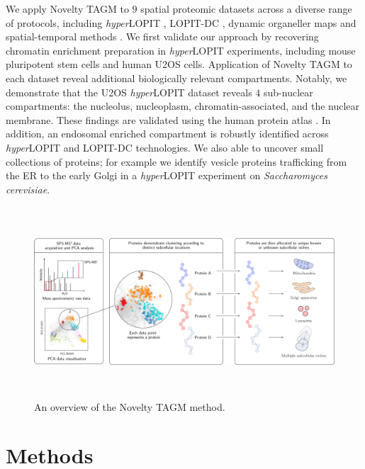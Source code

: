 \documentclass[12pt,english]{article}
\begin{document}
We apply Novelty TAGM to $9$ spatial proteomic datasets across a diverse range of protocols, including \textit{hyper}LOPIT \citep{hyper, Mulvey:2017}, LOPIT-DC \citep{DC:2018}, dynamic organeller maps \citep{Itzhak:2016} and spatial-temporal methods \citep{Jean_Beltran:2016}. We first validate our approach by recovering chromatin enrichment preparation in \textit{hyper}LOPIT experiments, including mouse pluripotent stem cells and human U2OS cells. Application of Novelty TAGM to each dataset reveal additional biologically relevant compartments. Notably, we demonstrate that the U2OS \textit{hyper}LOPIT dataset reveals $4$ sub-nuclear compartments: the nucleolus,  nucleoplasm, chromatin-associated, and the nuclear membrane. These findings are validated using the human protein atlas \citep{Thul:2017,Sullivan:2018}. In addition, an endosomal enriched compartment is robustly identified across \textit{hyper}LOPIT and LOPIT-DC technologies. We also able to uncover small collections of proteins; for example we identify vesicle proteins trafficking from the ER to the early Golgi in a \textit{hyper}LOPIT experiment on \textit{Saccharomyces cerevisiae}.
\begin{figure}[h]
	
	\centering
	\includegraphics[height=2.8in]{IMG_Protein_Allocation_Draft_v1}
	\caption{An overview of the Novelty TAGM method.}
	\label{figure:overview}
\end{figure}

\section{Methods}
\end{document}
